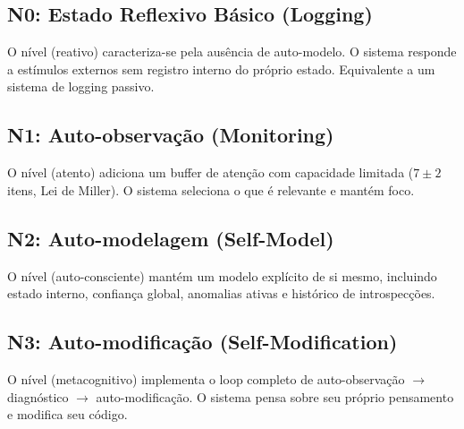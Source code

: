 \subsection{N0: Estado Reflexivo Básico (Logging)}

\begin{definicao}[Nível N0]
O nível  (reativo) caracteriza-se pela ausência de
auto-modelo. O sistema responde a estímulos externos sem registro
interno do próprio estado. Equivalente a um sistema de logging passivo.
\end{definicao}

\subsection{N1: Auto-observação (Monitoring)}

\begin{definicao}[Nível N1]
O nível  (atento) adiciona um buffer de atenção com
capacidade limitada ($7 \pm 2$ itens, Lei de Miller). O sistema
seleciona o que é relevante e mantém foco.
\end{definicao}

\subsection{N2: Auto-modelagem (Self-Model)}

\begin{definicao}[Nível N2]
O nível  (auto-consciente) mantém um modelo explícito de
si mesmo, incluindo estado interno, confiança global, anomalias ativas
e histórico de introspecções.
\end{definicao}

\subsection{N3: Auto-modificação (Self-Modification)}

\begin{definicao}[Nível N3]
O nível  (metacognitivo) implementa o loop completo de
auto-observação $\to$ diagnóstico $\to$ auto-modificação. O sistema
pensa sobre seu próprio pensamento e modifica seu código.
\end{definicao}

